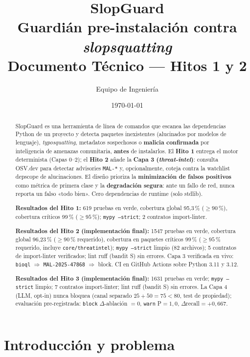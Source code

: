 \documentclass[11pt,a4paper]{article}
\title{\textbf{SlopGuard}\\[2pt]\large Guardián pre-instalación contra \emph{slopsquatting}\\[6pt]\normalsize Documento Técnico --- Hitos 1 y 2}
\author{Equipo de Ingeniería}
\date{\today}
\begin{document}
\maketitle
\thispagestyle{fancy}

\begin{abstract}
\noindent
SlopGuard es una herramienta de línea de comandos que escanea las dependencias
Python de un proyecto y detecta paquetes inexistentes (alucinados por modelos de
lenguaje), \emph{typosquatting}, metadatos sospechosos o \textbf{malicia confirmada}
por inteligencia de amenazas comunitaria, \textbf{antes} de instalarlos. El
\textbf{Hito 1} entrega el motor determinista (Capas 0--2); el \textbf{Hito 2} añade
la \textbf{Capa 3 (\emph{threat-intel})}: consulta OSV.dev para detectar advisories
\texttt{MAL-*} y, opcionalmente, coteja contra la watchlist depscope de alucinaciones.
El diseño prioriza la \textbf{minimización de falsos positivos} como métrica de primera
clase y la \textbf{degradación segura}: ante un fallo de red, nunca reporta un falso
«todo bien». Cero dependencias de runtime (solo stdlib).

\medskip
\noindent\textbf{Resultados del Hito 1:} 619 pruebas en verde,
cobertura global 95{,}3\,\% ($\geq 90\,\%$), cobertura críticos 99\,\% ($\geq 95\,\%$);
\texttt{mypy --strict}; 2 contratos import-linter.

\medskip
\noindent\textbf{Resultados del Hito 2 (implementación final):} 1547 pruebas en verde,
cobertura global 96{,}23\,\% ($\geq 90\,\%$ requerido), cobertura en paquetes críticos
99\,\% ($\geq 95\,\%$ requerido, incluye \texttt{core/threatintel}); \texttt{mypy --strict}
limpio (82 archivos); 5 contratos de import-linter verificados; lint ruff (bandit S) sin
errores. Capa 3 verificada en vivo: \texttt{bioql} $\Rightarrow$ \texttt{MAL-2025-47868}
$\Rightarrow$ block. CI en GitHub Actions sobre Python 3.11 y 3.12.

\medskip
\noindent\textbf{Resultados del Hito 3 (implementación final):} 1631 pruebas en verde;
\texttt{mypy --strict} limpio; 7 contratos import-linter; lint ruff (bandit S) sin errores.
La Capa 4 (LLM, opt-in) nunca bloquea (canal separado $25+50=75<80$, test de propiedad);
evaluación pre-registrada: \texttt{block} $\Delta$-ablación $=0$, \texttt{warn} P$=1{,}0$,
$\Delta$recall$=+0{,}667$.
\end{abstract}

\tableofcontents
\bigskip

\section{Introducción y problema}
\end{document}
